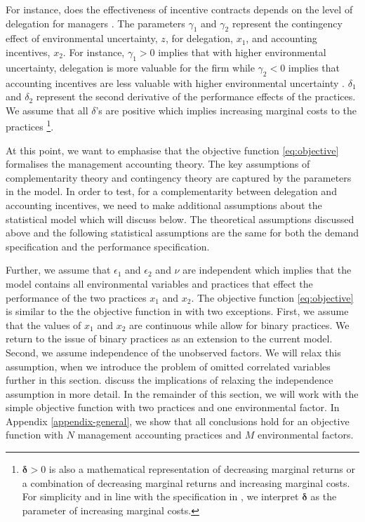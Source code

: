 \documentclass[12pt]{article}
\begin{document}
For instance, does the effectiveness of incentive contracts depends on the level of delegation for managers \citep{Moers2006}.  The parameters $\gamma_1$ and $\gamma_2$ represent the contingency effect of environmental uncertainty, $z$, for delegation, $x_1$, and accounting incentives, $x_2$. For instance, $\gamma_1 > 0$ implies that with higher environmental uncertainty, delegation is more valuable for the firm while $\gamma_2 < 0$ implies that accounting incentives are less valuable with higher environmental uncertainty \citep{Chenhall2003}. 
$\delta_1$ and $\delta_2$ represent the second derivative of the performance effects of the practices. We assume that all $\delta$'s are positive which implies increasing marginal costs to the practices  \footnote{$\mathbf{\delta} > 0$ is also a mathematical representation of decreasing marginal returns or a combination of decreasing marginal returns and increasing marginal  costs. For simplicity and in line with the specification in \citet{Grabner2013}, we interpret $\mathbf{\delta}$ as the parameter of  increasing marginal costs.}. 

At this point, we want to emphasise that the objective function \eqref{eq:objective} formalises the management accounting theory. The key assumptions of complementarity theory and contingency theory are captured by the parameters in the model. In order to test, for a complementarity between delegation and accounting incentives, we need to make additional assumptions about the statistical model which will discuss  below. The theoretical assumptions discussed above and the following statistical assumptions are the same for both the demand specification and the performance specification.

Further, we assume that $\epsilon_1$ and $\epsilon_2$ and $\nu$ are independent which implies that the model contains all environmental variables and practices that effect the performance of the two practices $x_1$ and $x_2$. The objective function \eqref{eq:objective} is similar to the the objective function in \citet{Kretschmer2012} with two exceptions. First, we assume that the values of $x_1$ and $x_2$ are continuous while \citet{Kretschmer2012} allow for binary practices. We return to the issue of binary practices as an extension to the current model. Second, we assume independence of the unobserved factors. We will relax this assumption, when we introduce the problem of omitted correlated variables further in this section. \citet{Athey1998} discuss the implications of relaxing the independence assumption in more detail.  In the remainder of this section, we will work with the simple objective function with two practices and one environmental factor. In Appendix \ref{appendix-general}, we show that all conclusions hold for an objective function with $N$ management accounting practices and $M$ environmental factors.
\end{document}
